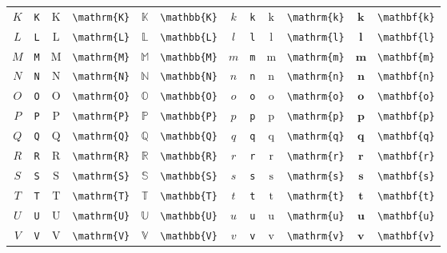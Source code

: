 \begin{table}[th]
\begin{tabular}{ c@{ }l c@{ }l c@{ }l c@{ }l c@{ }l c@{ }l}
		$K$ & \verb|K| & $\mathrm{K}$ & \verb|\mathrm{K}| & $\mathbb{K}$ & \verb|\mathbb{K}| & $k$ & \verb|k| & $\mathrm{k}$ & \verb|\mathrm{k}| & $\mathbf{k}$ & \verb|\mathbf{k}| \\
		$L$ & \verb|L| & $\mathrm{L}$ & \verb|\mathrm{L}| & $\mathbb{L}$ & \verb|\mathbb{L}| & $l$ & \verb|l| & $\mathrm{l}$ & \verb|\mathrm{l}| & $\mathbf{l}$ & \verb|\mathbf{l}| \\
		$M$ & \verb|M| & $\mathrm{M}$ & \verb|\mathrm{M}| & $\mathbb{M}$ & \verb|\mathbb{M}| & $m$ & \verb|m| & $\mathrm{m}$ & \verb|\mathrm{m}| & $\mathbf{m}$ & \verb|\mathbf{m}| \\
		$N$ & \verb|N| & $\mathrm{N}$ & \verb|\mathrm{N}| & $\mathbb{N}$ & \verb|\mathbb{N}| & $n$ & \verb|n| & $\mathrm{n}$ & \verb|\mathrm{n}| & $\mathbf{n}$ & \verb|\mathbf{n}| \\
		$O$ & \verb|O| & $\mathrm{O}$ & \verb|\mathrm{O}| & $\mathbb{O}$ & \verb|\mathbb{O}| & $o$ & \verb|o| & $\mathrm{o}$ & \verb|\mathrm{o}| & $\mathbf{o}$ & \verb|\mathbf{o}| \\
		$P$ & \verb|P| & $\mathrm{P}$ & \verb|\mathrm{P}| & $\mathbb{P}$ & \verb|\mathbb{P}| & $p$ & \verb|p| & $\mathrm{p}$ & \verb|\mathrm{p}| & $\mathbf{p}$ & \verb|\mathbf{p}| \\
		$Q$ & \verb|Q| & $\mathrm{Q}$ & \verb|\mathrm{Q}| & $\mathbb{Q}$ & \verb|\mathbb{Q}| & $q$ & \verb|q| & $\mathrm{q}$ & \verb|\mathrm{q}| & $\mathbf{q}$ & \verb|\mathbf{q}| \\
		$R$ & \verb|R| & $\mathrm{R}$ & \verb|\mathrm{R}| & $\mathbb{R}$ & \verb|\mathbb{R}| & $r$ & \verb|r| & $\mathrm{r}$ & \verb|\mathrm{r}| & $\mathbf{r}$ & \verb|\mathbf{r}| \\
		$S$ & \verb|S| & $\mathrm{S}$ & \verb|\mathrm{S}| & $\mathbb{S}$ & \verb|\mathbb{S}| & $s$ & \verb|s| & $\mathrm{s}$ & \verb|\mathrm{s}| & $\mathbf{s}$ & \verb|\mathbf{s}| \\
		$T$ & \verb|T| & $\mathrm{T}$ & \verb|\mathrm{T}| & $\mathbb{T}$ & \verb|\mathbb{T}| & $t$ & \verb|t| & $\mathrm{t}$ & \verb|\mathrm{t}| & $\mathbf{t}$ & \verb|\mathbf{t}| \\
		$U$ & \verb|U| & $\mathrm{U}$ & \verb|\mathrm{U}| & $\mathbb{U}$ & \verb|\mathbb{U}| & $u$ & \verb|u| & $\mathrm{u}$ & \verb|\mathrm{u}| & $\mathbf{u}$ & \verb|\mathbf{u}| \\
		$V$ & \verb|V| & $\mathrm{V}$ & \verb|\mathrm{V}| & $\mathbb{V}$ & \verb|\mathbb{V}| & $v$ & \verb|v| & $\mathrm{v}$ & \verb|\mathrm{v}| & $\mathbf{v}$ & \verb|\mathbf{v}| \\

\end{tabular}
\end{table}
